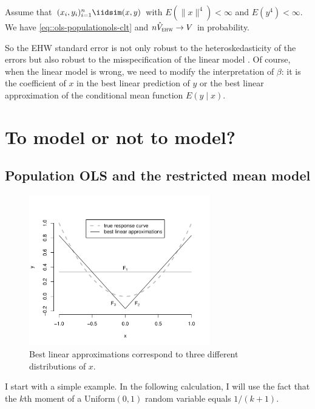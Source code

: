 \begin{theorem}
\label{thm::population-ols}
Assume that $(x_i, y_i)_{i=1}^n \iidsim (x, y)$ with $E ( \| x \|^4 )  <\infty  $ and $E (y^4) <\infty$. We have \eqref{eq::ols-populationols-clt} and $n \hat{V}_{\textsc{ehw}}  \rightarrow  V$ in probability. 
\end{theorem}


So the EHW standard error is not only robust to the heteroskedasticity of the errors but also robust to the misspecification of the linear model \citep{huber::1967, white1980using, angrist2008mostly, buja2019models}. Of course, when the linear model is wrong, we need to modify the interpretation of $\beta$: it is the coefficient of $x$ in the best linear prediction of $y$ or the best linear approximation of the conditional mean function $E(y\mid x)$. 

 
 
\section{To model or not to model?}

\subsection{Population OLS and the restricted mean model}

\begin{figure}[ht]
\centering
\includegraphics[width = 0.7\textwidth]{figures/populationOLS}
\caption{Best linear approximations correspond to three different distributions of $x$.}\label{fig::bestlinearapproximation}
\end{figure}

I start with a simple example. In the following calculation, I will use the fact that the $k$th moment of a Uniform$(0,1)$ random variable equals $1/(k+1)$.

